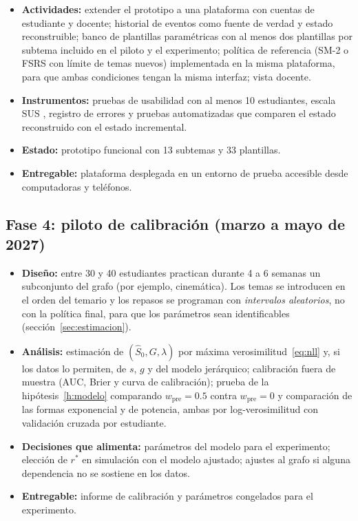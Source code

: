 \documentclass[12pt]{article}
\theoremstyle{definition}
\newcommand{\Sh}{\hat S}
\newcommand{\rstar}{r^{\ast}}
\begin{document}
\begin{itemize}
\item \textbf{Actividades:} extender el prototipo a una plataforma con cuentas de estudiante y docente; historial de eventos como fuente de verdad y estado reconstruible; banco de plantillas paramétricas con al menos dos plantillas por subtema incluido en el piloto y el experimento; política de referencia (SM-2 o FSRS con límite de temas nuevos) implementada en la misma plataforma, para que ambas condiciones tengan la misma interfaz; vista docente.
\item \textbf{Instrumentos:} pruebas de usabilidad con al menos 10 estudiantes, escala SUS \citep{brooke1996}, registro de errores y pruebas automatizadas que comparen el estado reconstruido con el estado incremental.
\item \textbf{Estado:} prototipo funcional con 13 subtemas y 33 plantillas.
\item \textbf{Entregable:} plataforma desplegada en un entorno de prueba accesible desde computadoras y teléfonos.
\end{itemize}

\subsection{Fase 4: piloto de calibración (marzo a mayo de 2027)}

\begin{itemize}
\item \textbf{Diseño:} entre 30 y 40 estudiantes practican durante 4 a 6 semanas un subconjunto del grafo (por ejemplo, cinemática). Los temas se introducen en el orden del temario y los repasos se programan con \emph{intervalos aleatorios}, no con la política final, para que los parámetros sean identificables (sección~\ref{sec:estimacion}).
\item \textbf{Análisis:} estimación de $(\Sh_0,G,\lambda)$ por máxima verosimilitud~\eqref{eq:nll} y, si los datos lo permiten, de $s$, $g$ y del modelo jerárquico; calibración fuera de muestra (AUC, Brier y curva de calibración); prueba de la hipótesis~\ref{h:modelo} comparando $w_{\mathrm{pre}}=0.5$ contra $w_{\mathrm{pre}}=0$ y comparación de las formas exponencial y de potencia, ambas por log-verosimilitud con validación cruzada por estudiante.
\item \textbf{Decisiones que alimenta:} parámetros del modelo para el experimento; elección de $\rstar$ en simulación con el modelo ajustado; ajustes al grafo si alguna dependencia no se sostiene en los datos.
\item \textbf{Entregable:} informe de calibración y parámetros congelados para el experimento.
\end{itemize}
\end{document}

